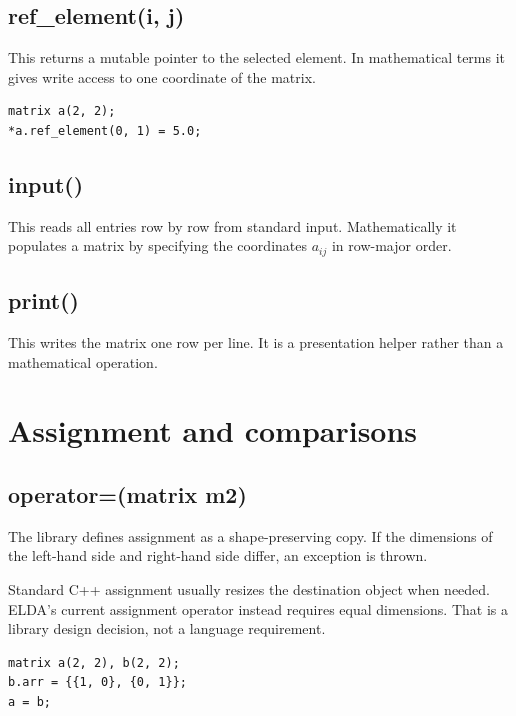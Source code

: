 \documentclass[11pt,a4paper,openany]{book}
\def\code#1{#1}%
\DeclareRobustCommand{\code}[1]{\texttt{\detokenize{#1}}}
\begin{document}
\subsection{\code{ref_element(i, j)}}
This returns a mutable pointer to the selected element. In mathematical terms it gives write access to one coordinate of the matrix.

\begin{lstlisting}[style=eldaCpp,caption={Pointer-based update}]
matrix a(2, 2);
*a.ref_element(0, 1) = 5.0;
\end{lstlisting}

\subsection{\code{input()}}
This reads all entries row by row from standard input. Mathematically it populates a matrix by specifying the coordinates \(a_{ij}\) in row-major order.

\subsection{\code{print()}}
This writes the matrix one row per line. It is a presentation helper rather than a mathematical operation.

\section{Assignment and comparisons}

\subsection{\code{operator=(matrix m2)}}
The library defines assignment as a shape-preserving copy. If the dimensions of the left-hand side and right-hand side differ, an exception is thrown.

\begin{techbox}
Standard C++ assignment usually resizes the destination object when needed. ELDA's current assignment operator instead requires equal dimensions. That is a library design decision, not a language requirement.
\end{techbox}

\begin{lstlisting}[style=eldaCpp,caption={Assignment example}]
matrix a(2, 2), b(2, 2);
b.arr = {{1, 0}, {0, 1}};
a = b;
\end{lstlisting}
\end{document}
